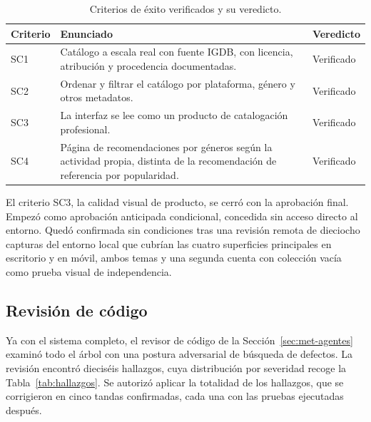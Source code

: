 \begin{table}[htp]
\centering
\begin{tabularx}{\textwidth}{ | C{0.12\textwidth} | Y | C{0.19\textwidth} | }
    \hline
    \textbf{Criterio} & \textbf{Enunciado} & \textbf{Veredicto} \\
    \hline
    SC1 & Catálogo a escala real con fuente IGDB, con licencia, atribución y procedencia documentadas. & Verificado \\
    \hline
    SC2 & Ordenar y filtrar el catálogo por plataforma, género y otros metadatos. & Verificado \\
    \hline
    SC3 & La interfaz se lee como un producto de catalogación profesional. & Verificado \\
    \hline
    SC4 & Página de recomendaciones por géneros según la actividad propia, distinta de la recomendación de referencia por popularidad. & Verificado \\
    \hline
\end{tabularx}
\caption{Criterios de éxito verificados y su veredicto.}
\label{tab:criterios}
\end{table}

El criterio SC3, la calidad visual de producto, se cerró con la aprobación final. Empezó
como aprobación anticipada condicional, concedida sin acceso directo al entorno. Quedó
confirmada sin condiciones tras una revisión remota de dieciocho capturas del entorno local
que cubrían las cuatro superficies principales en escritorio y en móvil, ambos temas y una
segunda cuenta con colección vacía como prueba visual de independencia.

\subsection{Revisión de código}\label{sec:pru-revision}\label{sec:pru-post-cierre}\label{sec:pru-lectura}

Ya con el sistema completo, el revisor de código de la Sección~\ref{sec:met-agentes} examinó
todo el árbol con una postura adversarial de búsqueda de defectos.
La revisión encontró dieciséis hallazgos, cuya distribución por severidad recoge la
Tabla~\ref{tab:hallazgos}. Se autorizó aplicar la totalidad de los hallazgos, que se
corrigieron en cinco tandas confirmadas, cada una con las pruebas ejecutadas después.

